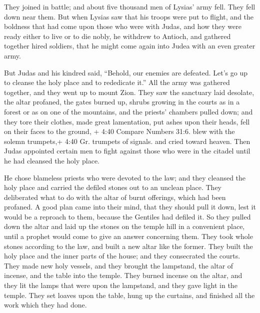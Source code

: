  They joined in battle; and about five thousand men of
Lysias' army fell. They fell down near them.  But when
Lysias saw that his troops were put to flight, and the boldness that had
come upon those who were with Judas, and how they were ready either to
live or to die nobly, he withdrew to Antioch, and gathered together
hired soldiers, that he might come again into Judea with an even greater
army.

 But Judas and his kindred said, ``Behold, our enemies are
defeated. Let's go up to cleanse the holy place and to rededicate it.''
 All the army was gathered together, and they went up to
mount Zion.  They saw the sanctuary laid desolate, the
altar profaned, the gates burned up, shrubs growing in the courts as in
a forest or as on one of the mountains, and the priests' chambers pulled
down;  and they tore their clothes, made great lamentation,
put ashes upon their heads,  fell on their faces to the
ground, + 4:40 Compare Numbers 31:6. blew with the solemn trumpets,+
4:40 Gr. trumpets of signals. and cried toward heaven. 
Then Judas appointed certain men to fight against those who were in the
citadel until he had cleansed the holy place.

 He chose blameless priests who were devoted to the law;
 and they cleansed the holy place and carried the defiled
stones out to an unclean place.  They deliberated what to
do with the altar of burnt offerings, which had been profaned.
 A good plan came into their mind, that they should pull it
down, lest it would be a reproach to them, because the Gentiles had
defiled it. So they pulled down the altar  and laid up the
stones on the temple hill in a convenient place, until a prophet would
come to give an answer concerning them.  They took whole
stones according to the law, and built a new altar like the former.
 They built the holy place and the inner parts of the
house; and they consecrated the courts.  They made new holy
vessels, and they brought the lampstand, the altar of incense, and the
table into the temple.  They burned incense on the altar,
and they lit the lamps that were upon the lampstand, and they gave light
in the temple.  They set loaves upon the table, hung up the
curtains, and finished all the work which they had done.

